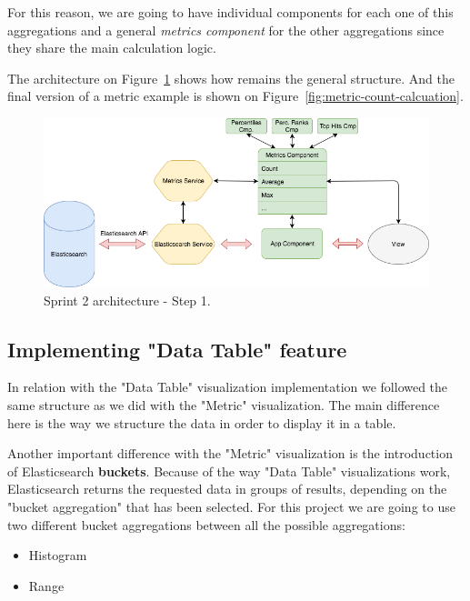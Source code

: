 \documentclass[a4paper, 12pt, english]{book}
\begin{document}
For this reason, we are going to have individual components for each one of this aggregations and a general \textit{metrics component} for the other aggregations since they share the main calculation logic.

The architecture on Figure~\ref{fig:sprint2-architecture-1} shows how remains the general structure. And the final version of a metric example is shown on Figure~\ref{fig:metric-count-calcuation}.
\begin{figure}
  \centering
  \includegraphics[width=13cm, keepaspectratio]{img/sprint2_architecture_1.png}
  \caption{Sprint 2 architecture - Step 1.}
  \label{fig:sprint2-architecture-1}
\end{figure}

\subsection{Implementing "Data Table" feature}
\label{sec:data-table-feature}
In relation with the "Data Table" visualization implementation we followed the same structure as we did with the "Metric" visualization. The main difference here is the way we structure the data in order to display it in a table.

Another important difference with the "Metric" visualization is the introduction of Elasticsearch \textbf{buckets}. Because of the way "Data Table" visualizations work, Elasticsearch returns the requested data in groups of results, depending on the "bucket aggregation" that has been selected. For this project we are going to use two different bucket aggregations between all the possible aggregations:
\begin{itemize}
    \item Histogram
    \item Range
\end{itemize}
\end{document}
